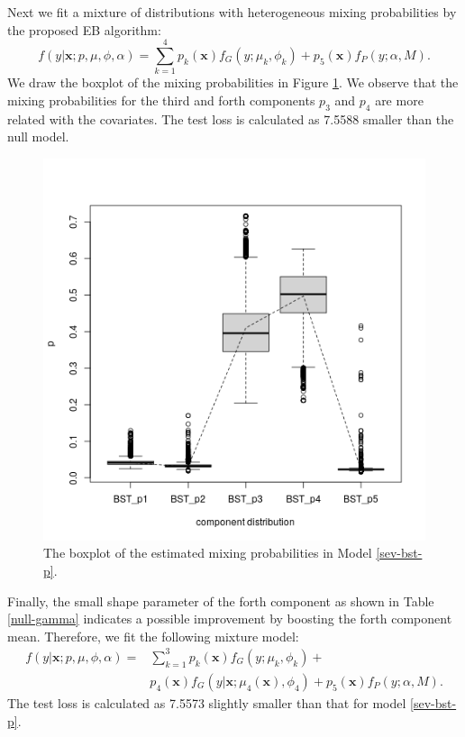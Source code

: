 \documentclass[11pt]{article}
\numberwithin{equation}{section}
\def\bx{\boldsymbol{x}}
\begin{document}
Next we fit a mixture of distributions with heterogeneous mixing probabilities by the proposed EB algorithm:
\begin{equation}\label{sev-bst-p}
f(y|\bx;p,\mu,\phi,\alpha)=\sum_{k=1}^4p_k(\bx)f_{G}(y;\mu_k,\phi_k)+p_5(\bx)f_{P}(y;\alpha,M).
\end{equation}
We draw the boxplot of the mixing probabilities in Figure \ref{bx-bst-p}.
We observe that the mixing probabilities for the third and forth components $p_3$ and $p_4$ are more related with the covariates.
The test loss is calculated as 7.5588 smaller than the null model.
	\begin{figure}[htp!]
		\centering
		\includegraphics[width=0.35\linewidth]{../plots/sev/bst_p}
		\caption{The boxplot of the estimated mixing probabilities in Model \eqref{sev-bst-p}.}\label{bx-bst-p}
	\end{figure}


Finally, the small shape parameter of the forth component as shown in Table \ref{null-gamma} indicates a possible improvement by boosting the forth component  mean.
Therefore, we fit the following mixture model:
	$$
	\begin{aligned}
		f(y|\bx;p,\mu,\phi,\alpha)=&\sum_{k=1}^3p_k(\bx)f_{G}(y;\mu_k,\phi_k)+ \\
		&p_4(\bx)f_{G}(y|\bx;\mu_4(\bx),\phi_4)+ p_5(\bx)f_{P}(y;\alpha,M).
	\end{aligned}
	$$
	The test loss is calculated as 7.5573 slightly smaller than that for model \eqref{sev-bst-p}. 
\end{document}
